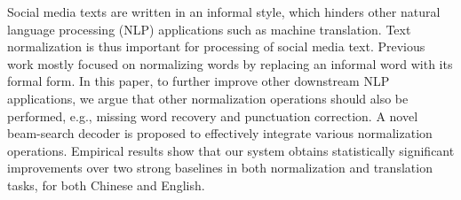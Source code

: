 Social media texts are written in an informal style, which hinders other natural language processing (NLP) applications such as machine
 translation. Text normalization is thus important for processing of
 social media text. Previous work mostly focused on normalizing words
 by replacing an informal word with its formal form. In this paper, to
 further improve other downstream NLP applications, we argue that other
 normalization operations should also be performed, e.g., missing word
 recovery and punctuation correction. A novel beam-search decoder is
 proposed to effectively integrate various normalization
 operations. Empirical results show that our system obtains
 statistically significant improvements over two strong baselines in
 both normalization and translation tasks, for both Chinese and
 English.

